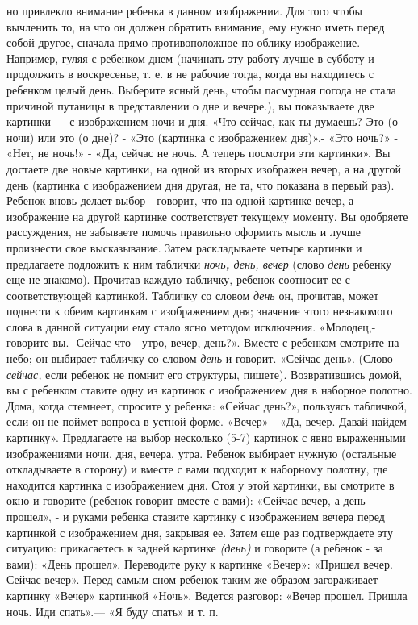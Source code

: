 \documentclass[a5paper]{book}
\renewcommand{\emph}[1]{\textit{#1}}
\begin{document}
но привлекло внимание ребенка в данном изображении. Для того чтобы
вычленить то, на что он должен обратить внимание, ему нужно иметь перед
собой другое, сначала прямо противоположное по облику изображение.
Например, гуляя с ребенком днем (начинать эту работу лучше в субботу и
продолжить в воскресенье, т. е. в не рабочие тогда, когда вы находитесь
с ребенком целый день. Выберите ясный день, чтобы пасмурная погода не
стала причиной путаницы в представлении о дне и вечере.), вы показываете
две картинки --- с изображением ночи и дня. «Что сейчас, как ты думаешь?
Это (о ночи) или это (о дне)? - «Это (картинка с изображением дня)»,-
«Это ночь?» - «Нет, не ночь!» - «Да, сейчас не ночь. А теперь посмотри
эти картинки». Вы достаете две новые картинки, на одной из вторых
изображен вечер, а на другой день (картинка с изображением дня другая,
не та, что показана в первый раз). Ребенок вновь делает выбор - говорит,
что на одной картинке вечер, а изображение на другой картинке
соответствует текущему моменту. Вы одобряете рассуждения, не забываете
помочь правильно оформить мысль и лучше произнести свое высказывание.
Затем раскладываете четыре картинки и предлагаете подложить к ним
таблички \emph{ночь\textbf{,} день, вечер} (слово \emph{день} ребенку
еще не знакомо). Прочитав каждую табличку, ребенок соотносит ее с
соответствующей картинкой. Табличку со словом \emph{день} он, прочитав,
может поднести к обеим картинкам с изображением дня; значение этого
незнакомого слова в данной ситуации ему стало ясно методом исключения.
«Молодец,- говорите вы.- Сейчас что - утро, вечер, день?». Вместе с
ребенком смотрите на небо; он выбирает табличку со словом \emph{день} и
говорит. «Сейчас день». (Слово \emph{сейчас,} если ребенок не помнит его
структуры, пишете). Возвратившись домой, вы с ребенком ставите одну из
картинок с изображением дня в наборное полотно. Дома, когда стемнеет,
спросите у ребенка: «Сейчас день?», пользуясь табличкой, если он не
поймет вопроса в устной форме. «Вечер» - «Да, вечер. Давай найдем
картинку». Предлагаете на выбор несколько (5-7) картинок с явно
выраженными изображениями ночи, дня, вечера, утра. Ребенок выбирает
нужную (остальные откладываете в сторону) и вместе с вами подходит к
наборному полотну, где находится картинка с изображением дня. Стоя у
этой картинки, вы смотрите в окно и говорите (ребенок говорит вместе с
вами): «Сейчас вечер, а день прошел», - и руками ребенка ставите
картинку с изображением вечера перед картинкой с изображением дня,
закрывая ее. Затем еще раз подтверждаете эту ситуацию: прикасаетесь к
задней картинке \emph{(день)} и говорите (а ребенок - за вами): «День
прошел». Переводите руку к картинке «Вечер»: «Пришел вечер. Сейчас
вечер». Перед самым сном ребенок таким же образом загораживает картинку
«Вечер» картинкой «Ночь». Ведется разговор: «Вечер прошел. Пришла ночь.
Иди спать».--- «Я буду спать» и т. п.
\end{document}
